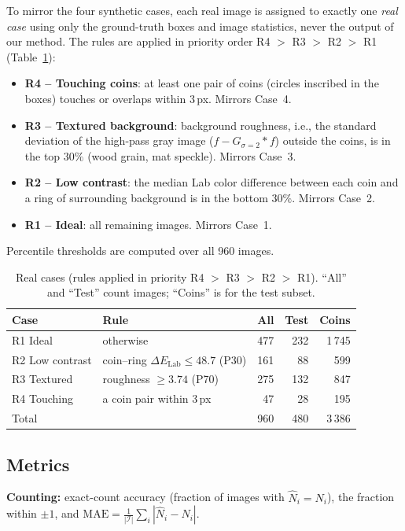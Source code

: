 \documentclass[conference,a4paper]{IEEEtran}
\begin{document}
To mirror the four synthetic cases, each real image is assigned to exactly one \emph{real case} using only the ground-truth boxes and image statistics, never the output of our method. The rules are applied in priority order R4 $>$ R3 $>$ R2 $>$ R1 (Table~\ref{tab:realcases}):
\begin{itemize}
\item \textbf{R4 -- Touching coins}: at least one pair of coins (circles inscribed in the boxes) touches or overlaps within 3\,px. Mirrors Case~4.
\item \textbf{R3 -- Textured background}: background roughness, i.e., the standard deviation of the high-pass gray image ($f-G_{\sigma=2}*f$) outside the coins, is in the top $30\%$ (wood grain, mat speckle). Mirrors Case~3.
\item \textbf{R2 -- Low contrast}: the median Lab color difference between each coin and a ring of surrounding background is in the bottom $30\%$. Mirrors Case~2.
\item \textbf{R1 -- Ideal}: all remaining images. Mirrors Case~1.
\end{itemize}
Percentile thresholds are computed over all 960 images.

\begin{table}[!t]
\centering
\caption{Real cases (rules applied in priority R4 $>$ R3 $>$ R2 $>$ R1). ``All'' and ``Test'' count images; ``Coins'' is for the test subset.}
\label{tab:realcases}
\footnotesize
\setlength{\tabcolsep}{3pt}
\begin{tabular}{@{}llrrr@{}}
\toprule
Case & Rule & All & Test & Coins\\
\midrule
R1 Ideal & otherwise & 477 & 232 & 1\,745\\
R2 Low contrast & coin--ring $\Delta E_{\text{Lab}} \le 48.7$ (P30) & 161 & 88 & 599\\
R3 Textured & roughness $\ge 3.74$ (P70) & 275 & 132 & 847\\
R4 Touching & a coin pair within 3\,px & 47 & 28 & 195\\
\midrule
Total & & 960 & 480 & 3\,386\\
\bottomrule
\end{tabular}
\end{table}

\subsection{Metrics}
\textbf{Counting:} exact-count accuracy (fraction of images with $\hat N_i=N_i$), the fraction within $\pm1$, and $\mathrm{MAE}=\frac{1}{|\mathcal{I}|}\sum_{i}|\hat N_i-N_i|$.
\end{document}
